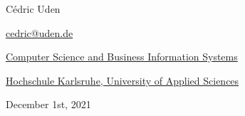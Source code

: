 \begin{center}
    

\vspace*{3mm}


\vspace*{16mm}

{\Large Cédric Uden}

\vspace*{2mm}

{\large\href{mailto:cedric@uden.de}{cedric@uden.de}}

\vspace*{6mm}

{\large\href{https://www.h-ka.de/en/about-hka/faculties/computer-science-and-business-information-systems/overview}{Computer Science and Business Information Systems}}

{\large\href{https://www.h-ka.de/en/}{Hochschule Karlsruhe, University of Applied Sciences}}

\vspace*{12mm}



\vspace*{12mm}

{\large December 1st, 2021}

\vspace*{12mm}

\end{center}
